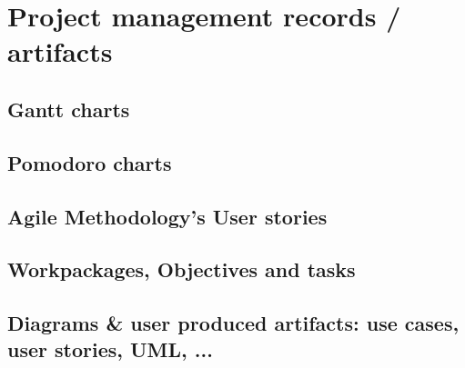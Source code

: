 \chapter{Project management records / artifacts}
\section{Gantt charts}
\section{Pomodoro charts}
\section{Agile Methodology's User stories}
\section{Workpackages, Objectives and tasks}
\section{Diagrams \& user produced artifacts: use cases, user stories, UML, ...}